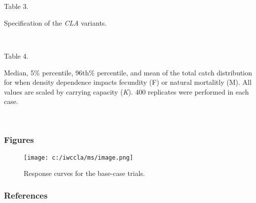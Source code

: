 \documentclass[]{article}
\begin{document}
~



~

\begin{center}
Table 3.

Specification of the \emph{CLA} variants.
\end{center}

~



\begin{center}
Table 4.

Median, 5\% percentile, 96th\% percentile, and mean of the total
catch distribution for when density dependence impacts fecundity (F)
or natural mortalitly (M). All values are scaled by carrying capacity (\emph{K}).
400 replicates were performed in each case.
\end{center}

~



% 

\subsubsection{Figures}\label{figures}

\begin{figure}[htbp]
\centering
\texttt{[image: c:/iwccla/ms/image.png]}
\caption{Response curves for the base-case trials.}
\label{fig:respcurv_base}
\end{figure}

\subsubsection{References}\label{references}
% 
%     
\end{document}
